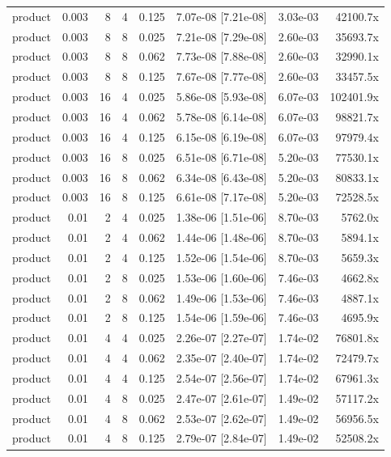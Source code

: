 \begin{tabular}{lrrrrrrr}
product & 0.003 & 8 & 4 & 0.125 & 7.07e-08 [7.21e-08] & 3.03e-03 & 42100.7x \\
product & 0.003 & 8 & 8 & 0.025 & 7.21e-08 [7.29e-08] & 2.60e-03 & 35693.7x \\
product & 0.003 & 8 & 8 & 0.062 & 7.73e-08 [7.88e-08] & 2.60e-03 & 32990.1x \\
product & 0.003 & 8 & 8 & 0.125 & 7.67e-08 [7.77e-08] & 2.60e-03 & 33457.5x \\
product & 0.003 & 16 & 4 & 0.025 & 5.86e-08 [5.93e-08] & 6.07e-03 & 102401.9x \\
product & 0.003 & 16 & 4 & 0.062 & 5.78e-08 [6.14e-08] & 6.07e-03 & 98821.7x \\
product & 0.003 & 16 & 4 & 0.125 & 6.15e-08 [6.19e-08] & 6.07e-03 & 97979.4x \\
product & 0.003 & 16 & 8 & 0.025 & 6.51e-08 [6.71e-08] & 5.20e-03 & 77530.1x \\
product & 0.003 & 16 & 8 & 0.062 & 6.34e-08 [6.43e-08] & 5.20e-03 & 80833.1x \\
product & 0.003 & 16 & 8 & 0.125 & 6.61e-08 [7.17e-08] & 5.20e-03 & 72528.5x \\
product & 0.01 & 2 & 4 & 0.025 & 1.38e-06 [1.51e-06] & 8.70e-03 & 5762.0x \\
product & 0.01 & 2 & 4 & 0.062 & 1.44e-06 [1.48e-06] & 8.70e-03 & 5894.1x \\
product & 0.01 & 2 & 4 & 0.125 & 1.52e-06 [1.54e-06] & 8.70e-03 & 5659.3x \\
product & 0.01 & 2 & 8 & 0.025 & 1.53e-06 [1.60e-06] & 7.46e-03 & 4662.8x \\
product & 0.01 & 2 & 8 & 0.062 & 1.49e-06 [1.53e-06] & 7.46e-03 & 4887.1x \\
product & 0.01 & 2 & 8 & 0.125 & 1.54e-06 [1.59e-06] & 7.46e-03 & 4695.9x \\
product & 0.01 & 4 & 4 & 0.025 & 2.26e-07 [2.27e-07] & 1.74e-02 & 76801.8x \\
product & 0.01 & 4 & 4 & 0.062 & 2.35e-07 [2.40e-07] & 1.74e-02 & 72479.7x \\
product & 0.01 & 4 & 4 & 0.125 & 2.54e-07 [2.56e-07] & 1.74e-02 & 67961.3x \\
product & 0.01 & 4 & 8 & 0.025 & 2.47e-07 [2.61e-07] & 1.49e-02 & 57117.2x \\
product & 0.01 & 4 & 8 & 0.062 & 2.53e-07 [2.62e-07] & 1.49e-02 & 56956.5x \\
product & 0.01 & 4 & 8 & 0.125 & 2.79e-07 [2.84e-07] & 1.49e-02 & 52508.2x \\

\end{tabular}
